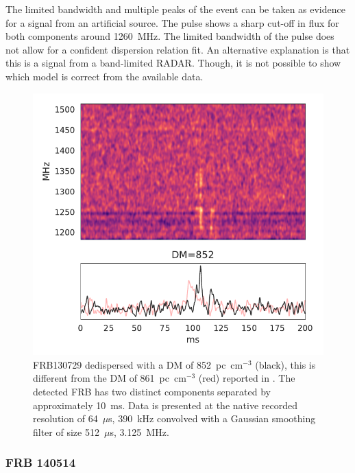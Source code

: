 \documentclass[a4paper,fleqn,usenatbib]{mnras}
\begin{document}
The limited bandwidth and multiple peaks of the event can be taken as evidence
for a signal from an artificial source. The pulse shows a sharp cut-off in flux
for both components around 1260~MHz. The limited bandwidth of the pulse does not
allow for a confident dispersion relation fit. An alternative explanation is
that this is a signal from a band-limited RADAR. Though, it is not possible to
show which model is correct from the available data.

\begin{figure}
    \includegraphics[width=1.0\linewidth]{figures/FRB130729.pdf}
    \caption{FRB130729 dedispersed with a DM of 852~pc~cm$^{-3}$ (black), this
    is different from the DM of 861~pc~cm$^{-3}$ (red) reported in
    \protect\cite{2016MNRAS.460L..30C}.  The detected FRB has two distinct components
    separated by approximately 10~ms. Data is presented at the native recorded
    resolution of 64~$\mu$s, 390~kHz convolved with a Gaussian smoothing filter
    of size 512~$\mu$s, 3.125~MHz.}
    \label{fig:FRB130729}
\end{figure}

\subsubsection{FRB 140514}
\end{document}
